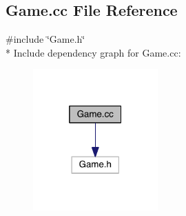 \hypertarget{a00005}{}\subsection{Game.\+cc File Reference}
\label{a00005}
{\ttfamily \#include \char`\"{}Game.\+h\char`\"{}}\\*
Include dependency graph for Game.\+cc\+:
\nopagebreak
\begin{figure}[H]
\begin{center}
\leavevmode
\includegraphics[width=136pt]{a00015}
\end{center}
\end{figure}
